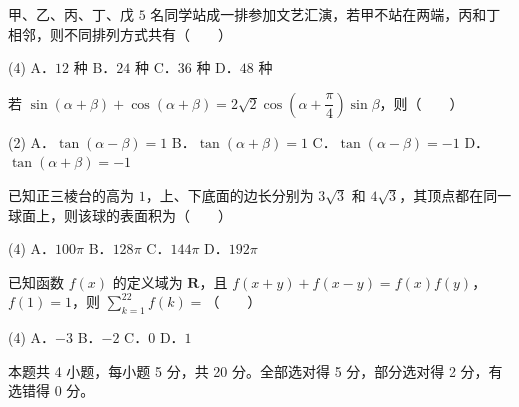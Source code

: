 \begin{question}
甲、乙、丙、丁、戊 $5$ 名同学站成一排参加文艺汇演，若甲不站在两端，丙和丁相邻，则不同排列方式共有（　　）

\begin{gkopts}(4)
\task A．$12$ 种
\task B．$24$ 种
\task C．$36$ 种
\task D．$48$ 种
\end{gkopts}

\end{question}
\begin{question}
若 $\sin(\alpha+\beta)+\cos(\alpha+\beta)=2\sqrt2\cos\left(\alpha+\dfrac\pi4\right)\sin\beta$，则（　　）

\begin{gkopts}(2)
\task A．$\tan(\alpha-\beta)=1$
\task B．$\tan(\alpha+\beta)=1$
\task C．$\tan(\alpha-\beta)=-1$
\task D．$\tan(\alpha+\beta)=-1$
\end{gkopts}

\end{question}
\begin{question}
已知正三棱台的高为 $1$，上、下底面的边长分别为 $3\sqrt3$ 和 $4\sqrt3$，其顶点都在同一球面上，则该球的表面积为（　　）

\begin{gkopts}(4)
\task A．$100\pi$
\task B．$128\pi$
\task C．$144\pi$
\task D．$192\pi$
\end{gkopts}

\end{question}
\begin{question}
已知函数 $f(x)$ 的定义域为 $\mathbf R$，且 $f(x+y)+f(x-y)=f(x)f(y)$，$f(1)=1$，则 $\displaystyle\sum_{k=1}^{22}f(k)=$（　　）

\begin{gkopts}(4)
\task A．$-3$
\task B．$-2$
\task C．$0$
\task D．$1$
\end{gkopts}

\par\medskip

\end{question}

\begin{gktip}
本题共 4 小题，每小题 5 分，共 20 分。全部选对得 5 分，部分选对得 2 分，有选错得 0 分。
\end{gktip}


